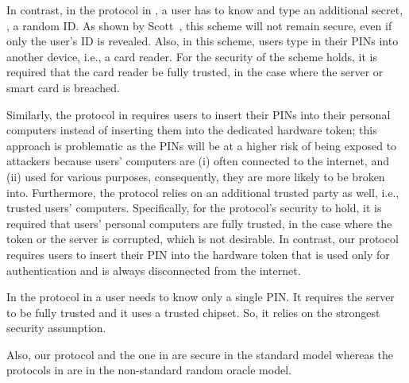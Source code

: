  In contrast, in the protocol in \cite{WangW18}, a user has to know and type an additional secret, \ie, a random ID. As shown by Scott~\cite{Scott12a}, this scheme will not remain secure, even if only the user's ID is revealed. Also, in this scheme, users type in their PINs into another device, i.e., a card reader. For the security of the scheme holds, it is required that the card reader be fully trusted, in the case where the server or smart card is breached. 
 
  
   Similarly, the protocol in \cite{JareckiJKSS21} requires users to insert their PINs into their personal computers instead of inserting them into the dedicated hardware token; this approach is problematic as the PINs will be at a higher risk of being exposed to attackers because users' computers are (i) often connected to the internet, and (ii) used for various purposes, consequently, they are more likely to be broken into. Furthermore, the protocol relies on an additional trusted party as well, i.e., trusted users' computers. Specifically, for the protocol's security to hold, it is required that users' personal computers are fully trusted, in the case where the token or the server is corrupted, which is not desirable. In contrast, our protocol requires users to insert their PIN into the hardware token that is used only for authentication and is always disconnected from the internet. 
 
 In the protocol in \cite{MatsuoMY11} a user needs to know only a single PIN. It requires the server to be fully trusted and it uses a trusted chipset. So, it relies on the strongest security assumption.
 
 
 Also, our protocol and the one in \cite{MatsuoMY11} are secure in the standard model whereas the protocols in \cite{WangW18,JareckiJKSS21} are in the non-standard random oracle model. 

